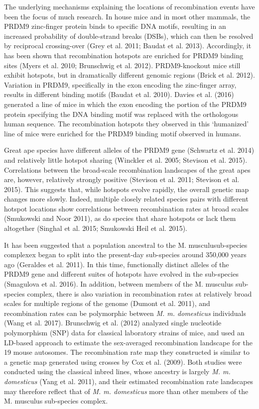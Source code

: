 The underlying mechanisms explaining the locations of recombination events have been the focus of much research. In house mice and in most other mammals, the PRDM9 zinc-finger protein binds to specific DNA motifs, resulting in an increased probability of double-strand breaks (DSBs), which can then be resolved by reciprocal crossing-over (Grey et al. 2011; Baudat et al. 2013). Accordingly, it has been shown that recombination hotspots are enriched for PRDM9 binding sites (Myers et al. 2010; Brunschwig et al. 2012). PRDM9-knockout mice still exhibit hotspots, but in dramatically different genomic regions (Brick et al. 2012). Variation in PRDM9, specifically in the exon encoding the zinc-finger array, results in different binding motifs (Baudat et al. 2010). Davies et al. (2016) generated a line of mice in which the exon encoding the portion of the PRDM9 protein specifying the DNA binding motif was replaced with the orthologous human sequence. The recombination hotspots they observed in this ‘humanized’ line of mice were enriched for the PRDM9 binding motif observed in humans. 

Great ape species have different alleles of the PRDM9 gene (Schwartz et al. 2014) and relatively little hotspot sharing (Winckler et al. 2005; Stevison et al. 2015). Correlations between the broad-scale recombination landscapes of the great apes are, however, relatively strongly positive (Stevison et al. 2011; Stevison et al. 2015). This suggests that, while hotspots evolve rapidly, the overall genetic map changes more slowly. Indeed, multiple closely related species pairs with different hotspot locations show correlations between recombination rates at broad scales (Smukowski and Noor 2011), as do species that share hotspots or lack them altogether (Singhal et al. 2015; Smukowski Heil et al. 2015).
 
It has been suggested that a population ancestral to the M. musculusub-species complexex began to split into the present-day sub-species around 350,000 years ago (Geraldes et al. 2011). In this time, functionally distinct alleles of the PRDM9 gene and different suites of hotspots have evolved in the sub-species (Smagulova et al. 2016). In addition, between members of the M. musculus sub-species complex, there is also variation in recombination rates at relatively broad scales for multiple regions of the genome (Dumont et al. 2011), and recombination rates can be polymorphic between \emph{M. m. domesticus} individuals (Wang et al. 2017). Brunschwig et al. (2012) analyzed single nucleotide polymorphism (SNP) data for classical laboratory strains of mice, and used an LD-based approach to estimate the sex-averaged recombination landscape for the 19 mouse autosomes. The recombination rate map they constructed is similar to a genetic map generated using crosses by Cox et al. (2009). Both studies were conducted using the classical inbred lines, whose ancestry is largely \emph{M. m. domesticus} (Yang et al. 2011), and their estimated recombination rate landscapes may therefore reflect that of \emph{M. m. domesticus} more than other members of the M. musculus sub-species complex.
 
